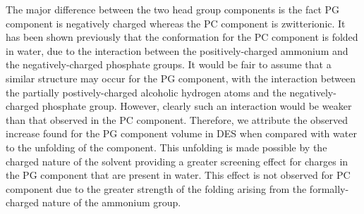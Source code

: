 \documentclass[twoside,twocolumn,9pt]{article}
\begin{document}
The major difference between the two head group components is the fact PG component is negatively charged whereas the PC component is zwitterionic. It has been shown previously that the conformation for the PC component is folded in water,\cite{Gilliams2016} due to the interaction between the positively-charged ammonium and the negatively-charged phosphate groups. It would be fair to assume that a similar structure may occur for the PG component, with the interaction between the partially postively-charged alcoholic hydrogen atoms and the negatively-charged phosphate group. However, clearly such an interaction would be weaker than that observed in the PC component. Therefore, we attribute the observed increase found for the PG component volume in DES when compared with water to the unfolding of the component. This unfolding is made possible by the charged nature of the solvent providing a greater screening effect for charges in the PG component that are present in water. This effect is not observed for PC component due to the greater strength of the folding arising from the formally-charged nature of the ammonium group. 

\end{document}
